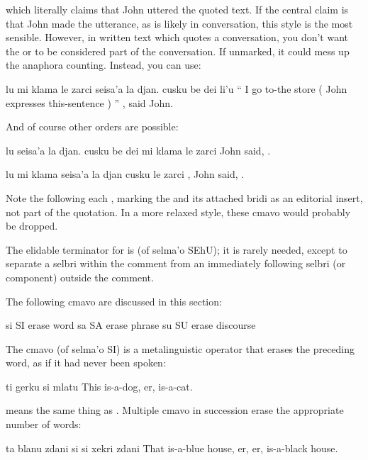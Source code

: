 {\noindent}which literally claims that John uttered the quoted text. If
    the central claim is that John made the utterance, as is likely
    in conversation, this style is the most sensible. However, in
    written text which quotes a conversation, you don't want the
     or  to be considered part of the
    conversation. If unmarked, it could mess up the anaphora
    counting. Instead, you can use:
\begin{example}
lu mi klama le zarci\n
\T	seisa'a la djan. cusku be dei li'u\n
`` I go to-the store\n
\T	( John expresses this-sentence ) ''\n
{}, said John.
\end{example}

And of course other orders are possible:
\begin{example}
lu seisa'a la djan. cusku be dei mi klama le zarci\n
John said, .
\end{example}

\begin{example}
lu mi klama seisa'a la djan cusku le zarci\n
{}, John said, .
\end{example}

Note the  following each , marking the
     and its attached bridi as an editorial insert, not part
    of the quotation. In a more relaxed style, these  cmavo
    would probably be dropped.

The elidable terminator for  is  (of selma'o
    SEhU); it is rarely needed, except to separate a selbri within
    the  comment from an immediately following selbri (or
    component) outside the comment.



The following cmavo are discussed in this section:

   si  SI  erase word
    sa  SA  erase phrase
    su  SU  erase discourse

The cmavo  (of selma'o SI) is a metalinguistic operator
    that erases the preceding word, as if it had never been spoken:
\begin{example}
ti gerku si mlatu\n
This is-a-dog, er, is-a-cat.
\end{example}

{\noindent}means the same thing as . Multiple  cmavo in
    succession erase the appropriate number of words:
\begin{example}
ta blanu zdani si si xekri zdani\n
That is-a-blue house, er, er, is-a-black house.
\end{example}

